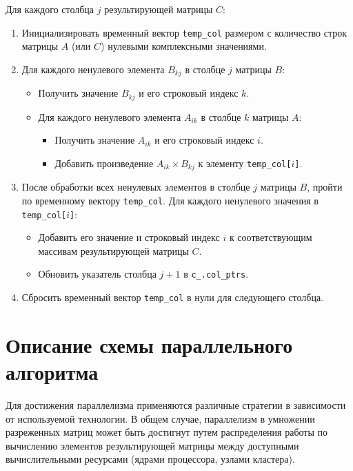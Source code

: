 \documentclass[12pt]{article}
\begin{document}
Для каждого столбца $j$ результирующей матрицы $C$:
\begin{enumerate}
    \item Инициализировать временный вектор \texttt{temp\_col} размером с количество строк матрицы $A$ (или $C$) нулевыми комплексными значениями.
    \item Для каждого ненулевого элемента $B_{kj}$ в столбце $j$ матрицы $B$:
    \begin{itemize}
        \item Получить значение $B_{kj}$ и его строковый индекс $k$.
        \item Для каждого ненулевого элемента $A_{ik}$ в столбце $k$ матрицы $A$:
        \begin{itemize}
            \item Получить значение $A_{ik}$ и его строковый индекс $i$.
            \item Добавить произведение $A_{ik} \times B_{kj}$ к элементу \texttt{temp\_col[$i$]}.
        \end{itemize}
        \end{itemize}
    \item После обработки всех ненулевых элементов в столбце $j$ матрицы $B$, пройти по временному вектору \texttt{temp\_col}. Для каждого ненулевого значения в \texttt{temp\_col[$i$]}:
    \begin{itemize}
        \item Добавить его значение и строковый индекс $i$ к соответствующим массивам результирующей матрицы $C$.
        \item Обновить указатель столбца $j+1$ в \texttt{c\_.col\_ptrs}.
    \end{itemize}
    \item Сбросить временный вектор \texttt{temp\_col} в нули для следующего столбца.
\end{enumerate}
\newpage

\section{Описание схемы параллельного алгоритма}
Для достижения параллелизма применяются различные стратегии в зависимости от используемой технологии. В общем случае, параллелизм в умножении разреженных матриц может быть достигнут путем распределения работы по вычислению элементов результирующей матрицы между доступными вычислительными ресурсами (ядрами процессора, узлами кластера).
\end{document}
